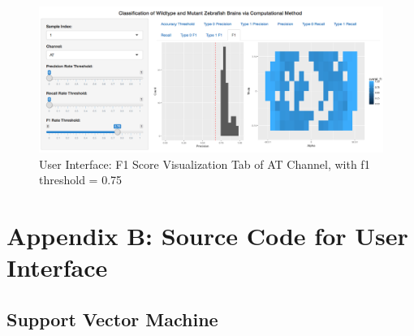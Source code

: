 \documentclass[10pt,letterpaper]{article}
\begin{document}
\begin{figure}[h]

{\centering \includegraphics[width=4.9in]{figures/shiny7} 

}

\caption{User Interface: F1 Score Visualization Tab of AT Channel, with f1 threshold = 0.75}\label{fig:shiny7}
\end{figure}

\newpage

\section{Appendix B: Source Code for User
Interface}\label{appendix-b-source-code-for-user-interface}

\subsection{Support Vector Machine}\label{support-vector-machine}
\end{document}

